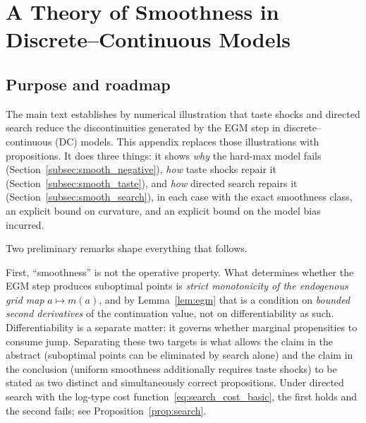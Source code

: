 
\theoremstyle{plain}
\newtheorem{lemma}{Lemma}[section]
\newtheorem{proposition}[lemma]{Proposition}
\newtheorem{corollary}[lemma]{Corollary}

\theoremstyle{definition}
\newtheorem{definition}[lemma]{Definition}
\newtheorem{assumption}{Assumption}[section]
\newtheorem{remark}[lemma]{Remark}

\newcommand{\keep}{\mathrm{keep}}
\newcommand{\adj}{\mathrm{adj}}

\section{A Theory of Smoothness in Discrete--Continuous Models}
\label{sec:appdx_smoothness}

\subsection{Purpose and roadmap}
\label{subsec:smooth_purpose}

The main text establishes by numerical illustration that taste shocks and directed
search reduce the discontinuities generated by the EGM step in discrete--continuous
(DC) models. This appendix replaces those illustrations with propositions. It does
three things: it shows \emph{why} the hard-max model fails
(Section~\ref{subsec:smooth_negative}), \emph{how} taste shocks repair it
(Section~\ref{subsec:smooth_taste}), and \emph{how} directed search repairs it
(Section~\ref{subsec:smooth_search}), in each case with the exact smoothness class,
an explicit bound on curvature, and an explicit bound on the model bias incurred.

Two preliminary remarks shape everything that follows.

First, ``smoothness'' is not the operative property. What determines whether the EGM
step produces suboptimal points is \emph{strict monotonicity of the endogenous grid
map} $a\mapsto m(a)$, and by Lemma~\ref{lem:egm} that is a condition on \emph{bounded
second derivatives} of the continuation value, not on differentiability as such.
Differentiability is a separate matter: it governs whether marginal propensities to
consume jump. Separating these two targets is what allows the claim in the abstract
(suboptimal points can be eliminated by search alone) and the claim in the conclusion
(uniform smoothness additionally requires taste shocks) to be stated as two distinct
and simultaneously correct propositions. Under directed search with the log-type cost
function~\eqref{eq:search_cost_basic}, the first holds and the second fails; see
Proposition~\ref{prop:search}.

